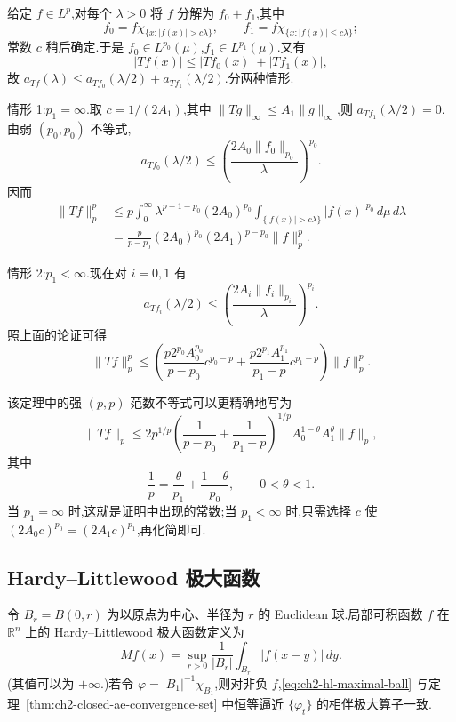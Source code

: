 \begin{Proof}
给定 $f\in L^p$,对每个 $\lambda>0$ 将 $f$ 分解为 $f_0+f_1$,其中
\[
 f_0=f\chi_{\{x:|f(x)|>c\lambda\}},\qquad
 f_1=f\chi_{\{x:|f(x)|\le c\lambda\}};
\]
常数 $c$ 稍后确定.于是 $f_0\in L^{p_0}(\mu)$,$f_1\in L^{p_1}(\mu)$.又有
\[
 |Tf(x)|\le|Tf_0(x)|+|Tf_1(x)|,
\]
故 $a_{Tf}(\lambda)\le a_{Tf_0}(\lambda/2)+a_{Tf_1}(\lambda/2)$.分两种情形.

情形 1:$p_1=\infty$.取 $c=1/(2A_1)$,其中 $\|Tg\|_\infty\le A_1\|g\|_\infty$,则 $a_{Tf_1}(\lambda/2)=0$.由弱 $(p_0,p_0)$ 不等式,
\[
 a_{Tf_0}(\lambda/2)\le
 \left(\frac{2A_0\|f_0\|_{p_0}}{\lambda}\right)^{p_0}.
\]
因而
\[
\begin{aligned}
 \|Tf\|_p^p
 &\le p\int_0^\infty\lambda^{p-1-p_0}(2A_0)^{p_0}
 \int_{\{|f(x)|>c\lambda\}}|f(x)|^{p_0}\,d\mu\,d\lambda\\
 &=\frac{p}{p-p_0}(2A_0)^{p_0}(2A_1)^{p-p_0}\|f\|_p^p.
\end{aligned}
\]

情形 2:$p_1<\infty$.现在对 $i=0,1$ 有
\[
 a_{Tf_i}(\lambda/2)\le
 \left(\frac{2A_i\|f_i\|_{p_i}}{\lambda}\right)^{p_i}.
\]
照上面的论证可得
\[
 \|Tf\|_p^p\le
 \left(\frac{p2^{p_0}A_0^{p_0}}{p-p_0}c^{p_0-p}
 +\frac{p2^{p_1}A_1^{p_1}}{p_1-p}c^{p_1-p}\right)\|f\|_p^p.
\]
\end{Proof}

\hypertarget{sample-page-042}{}
该定理中的强 $(p,p)$ 范数不等式可以更精确地写为
\begin{equation}
\label{eq:ch2-marcinkiewicz-strong-bound}
 \|Tf\|_p\le 2p^{1/p}
 \left(\frac{1}{p-p_0}+\frac{1}{p_1-p}\right)^{1/p}
 A_0^{1-\theta}A_1^\theta\|f\|_p,
\end{equation}
其中
\[
 \frac1p=\frac{\theta}{p_1}+\frac{1-\theta}{p_0},\qquad0<\theta<1.
\]
当 $p_1=\infty$ 时,这就是证明中出现的常数;当 $p_1<\infty$ 时,只需选择 $c$ 使 $(2A_0c)^{p_0}=(2A_1c)^{p_1}$,再化简即可.

\subsection{Hardy--Littlewood 极大函数}
\label{sec:ch2-hl-maximal-function}

令 $B_r=B(0,r)$ 为以原点为中心、半径为 $r$ 的 Euclidean 球.局部可积函数 $f$ 在 $\mathbb R^n$ 上的 Hardy--Littlewood 极大函数定义为
\begin{equation}
\label{eq:ch2-hl-maximal-ball}
 Mf(x)=\sup_{r>0}\frac1{|B_r|}\int_{B_r}|f(x-y)|\,dy.
\end{equation}
(其值可以为 $+\infty$.)若令 $\varphi=|B_1|^{-1}\chi_{B_1}$,则对非负 $f$,\eqref{eq:ch2-hl-maximal-ball} 与定理~\ref{thm:ch2-closed-ae-convergence-set} 中恒等逼近 $\{\varphi_t\}$ 的相伴极大算子一致.

